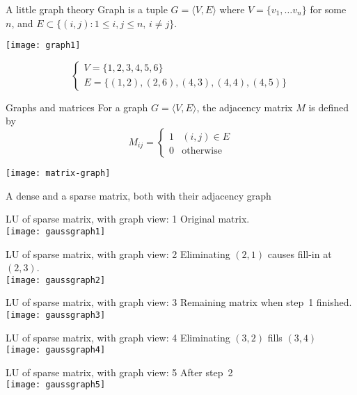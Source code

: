 \begin{frame}{A little graph theory}
  Graph is a tuple $G=\langle V,E\rangle$ where
  $V=\{v_1,\ldots v_n\}$ for some~$n$, and $E\subset\{(i,j)\colon 1\leq
  i,j\leq n,\,i\not=j\}$.

  \texttt{[image: graph1]}

  \[    \begin{cases}
    V=\{1,2,3,4,5,6\}\\
    E=\{ (1,2),(2,6),(4,3),(4,4),(4,5)\}
  \end{cases}
  \]
\end{frame}

\begin{frame}{Graphs and matrices}
  For a graph $G=\langle V,E\rangle$,
  the adjacency matrix $M$ is defined by
  \[ 
  M_{ij}=
  \begin{cases}1&(i,j)\in E\\ 0&\mbox{otherwise}\end{cases}
  \]
  
  \texttt{[image: matrix-graph]}

  A dense and a sparse matrix, both with their adjacency
  graph
\end{frame}


\begin{frame}{LU of sparse matrix, with graph view: 1}
Original matrix.\\
\texttt{[image: gaussgraph1]}
\end{frame}
\begin{frame}{LU of sparse matrix, with graph view: 2}
  Eliminating $(2,1)$ causes fill-in at $(2,3)$.\\
\texttt{[image: gaussgraph2]}
\end{frame}
\begin{frame}{LU of sparse matrix, with graph view: 3}
  Remaining matrix when step~1 finished.\\
\texttt{[image: gaussgraph3]}
\end{frame}
\begin{frame}{LU of sparse matrix, with graph view: 4}
  Eliminating $(3,2)$ fills $(3,4)$\\
\texttt{[image: gaussgraph4]}
\end{frame}
\begin{frame}{LU of sparse matrix, with graph view: 5}
  After step~2\\
\texttt{[image: gaussgraph5]}
\end{frame}

